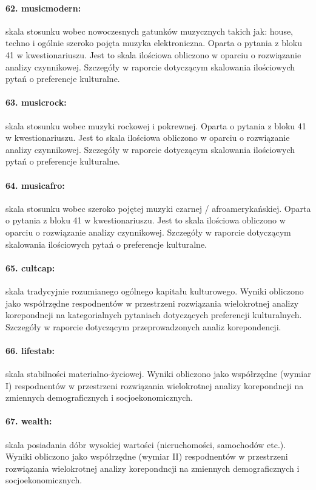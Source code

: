 \documentclass[10pt, a4paper]{article}
\begin{document}
\paragraph{62. musicmodern:} skala stosunku wobec nowoczesnych gatunków muzycznych takich jak: house, techno i ogólnie szeroko pojęta muzyka elektroniczna. Oparta o pytania z bloku 41 w kwestionariuszu. Jest to skala ilościowa obliczono w oparciu o rozwiązanie analizy czynnikowej. Szczegóły w raporcie dotyczącym skalowania ilościowych pytań o preferencje kulturalne.
\paragraph{63. musicrock:} skala stosunku wobec muzyki rockowej i pokrewnej. Oparta o pytania z bloku 41 w kwestionariuszu. Jest to skala ilościowa obliczono w oparciu o rozwiązanie analizy czynnikowej. Szczegóły w raporcie dotyczącym skalowania ilościowych pytań o preferencje kulturalne.
\paragraph{64. musicafro:} skala stosunku wobec szeroko pojętej muzyki czarnej / afroamerykańskiej. Oparta o pytania z bloku 41 w kwestionariuszu. Jest to skala ilościowa obliczono w oparciu o rozwiązanie analizy czynnikowej. Szczegóły w raporcie dotyczącym skalowania ilościowych pytań o preferencje kulturalne.
\paragraph{65. cultcap:} skala tradycyjnie rozumianego ogólnego kapitału kulturowego. Wyniki obliczono jako współrzędne respodnentów w przestrzeni rozwiązania wielokrotnej analizy korepondncji na kategorialnych pytaniach dotyczących preferencji kulturalnych. Szczegóły w raporcie dotyczącym przeprowadzonych analiz korepondencji.
\paragraph{66. lifestab:} skala stabilności materialno-życiowej.  Wyniki obliczono jako współrzędne (wymiar I) respodnentów w przestrzeni rozwiązania wielokrotnej analizy korepondncji na zmiennych demograficznych i socjoekonomicznych.
\paragraph{67. wealth:} skala posiadania dóbr wysokiej wartości (nieruchomości, samochodów etc.). Wyniki obliczono jako współrzędne (wymiar II) respodnentów w przestrzeni rozwiązania wielokrotnej analizy korepondncji na zmiennych demograficznych i socjoekonomicznych.
\end{document}
